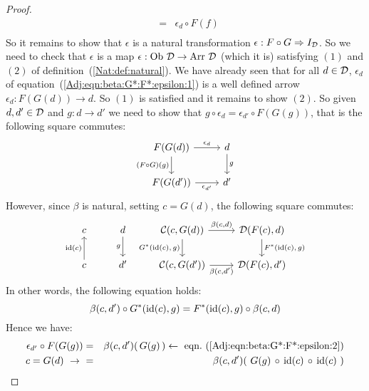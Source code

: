 \begin{proof}
\begin{eqnarray*}
            &=&\epsilon_{d}\circ F(f)\\
        \end{eqnarray*}
    So it remains to show that $\epsilon$ is a natural transformation 
    $\epsilon:F\circ G\Rightarrow I_{\cal D}$. So we need to check that 
    $\epsilon$ is a map $\epsilon:\ob\ \Dat\to\arr\ \Dat$ (which it is) satisfying
    $(1)$ and $(2)$ of definition~(\ref{Nat:def:natural}). We have already
    seen that for all $d\in\mbox{$\cal D$}$, $\epsilon_{d}$ of
    equation~(\ref{Adj:eqn:beta:G*:F*:epsilon:1}) is a well defined arrow
    $\epsilon_{d}:F(G(d))\to d$. So $(1)$ is satisfied and it remains to show $(2)$.
    So given $d,d'\in\mbox{$\cal D$}$ and $g:d\to d'$ we need to show that
    $g \circ \epsilon_{d}=\epsilon_{d'}\circ F(G(g))$, that is the following 
    square commutes:
        \[
            \begin{tikzcd}
                F(G(d))\arrow[r, "\epsilon_{d}"]\arrow[d, swap,"(F\circ G)(g)"]
                &d\arrow[d, "g"]
                \\
                F(G(d'))\arrow[r, swap, "\epsilon_{d'}"]
                &d'
            \end{tikzcd}
        \]
    However, since $\beta$ is natural, setting $c=G(d)$, the following
    square commutes:
        \[
            \begin{tikzcd}
                c
                &d\arrow[d,swap, "g"]
                &\Cat(c,G(d))\arrow[r, "\beta\mbox{$(c,d)$}"]
                \arrow[d, swap,"G^{*}\mbox{$({\rm id}(c),\,g)$}"]
                &\Dat(F(c),d)
                \arrow[d, "F^{*}\mbox{$({\rm id}(c),\,g)$}"]
                \\
                c\arrow[u, "{\rm id}(c)"]
                &d'
                &\Cat(c,G(d'))\arrow[r, swap, "\beta\mbox{$(c,d')$}"]
                &\Dat(F(c),d')
            \end{tikzcd}
        \]
    In other words, the following equation holds:
        \begin{equation}\label{Adj:eqn:beta:G*:F*:epsilon:4}
            \beta(c,d')\circ G^{*}(\mbox{\rm id}(c),g) = F^{*}(\mbox{\rm id}(c),g)\circ\beta(c,d)
        \end{equation}
    Hence we have: 
        \begin{eqnarray*}\epsilon_{d'}\circ F(G(g))
            &=&\beta(c,d')(\,G(g)\,)
            \leftarrow\ \mbox{eqn.~(\ref{Adj:eqn:beta:G*:F*:epsilon:2})}\\
            \mbox{$c=G(d)$}\ \to\ 
            &=&\beta(c,d')(\ G(g)\,\circ\,\id(c)\,\circ\,\id(c)\ )\\

\end{eqnarray*}
\end{proof}
